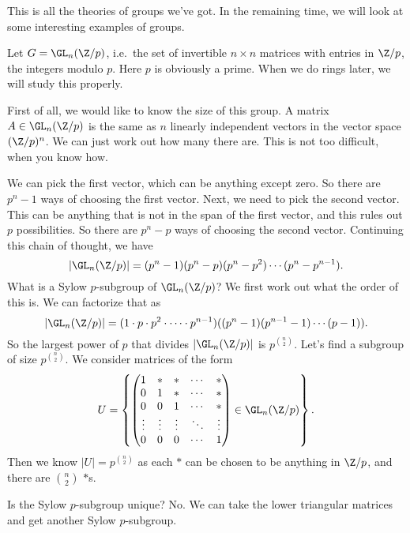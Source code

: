 \documentclass[a4paper]{article}
\begin{document}
This is all the theories of groups we've got. In the remaining time, we will look at some interesting examples of groups.
\begin{eg}
  Let $G = \GL_n(\Z/p)$, i.e.\ the set of invertible $n\times n$ matrices with entries in $\Z/p$, the integers modulo $p$. Here $p$ is obviously a prime. When we do rings later, we will study this properly.

  First of all, we would like to know the size of this group. A matrix $A \in \GL_n(\Z/p)$ is the same as $n$ linearly independent vectors in the vector space $(\Z/p)^n$. We can just work out how many there are. This is not too difficult, when you know how.

  We can pick the first vector, which can be anything except zero. So there are $p^n - 1$ ways of choosing the first vector. Next, we need to pick the second vector. This can be anything that is not in the span of the first vector, and this rules out $p$ possibilities. So there are $p^n - p$ ways of choosing the second vector. Continuing this chain of thought, we have
  \[
    |\GL_n(\Z/p)| = (p^n - 1)(p^n - p)(p^n - p^2) \cdots (p^n - p^{n - 1}).
  \]
  What is a Sylow $p$-subgroup of $\GL_n(\Z/p)$? We first work out what the order of this is. We can factorize that as
  \[
    |\GL_n(\Z/p)|= (1 \cdot p \cdot p^2 \cdot \cdots \cdot p^{n - 1}) ((p^n - 1)(p^{n - 1} - 1) \cdots (p - 1)).
  \]
  So the largest power of $p$ that divides $|\GL_n(\Z/p)|$ is $p^{\binom{n}{2}}$. Let's find a subgroup of size $p^{\binom{n}{2}}$. We consider matrices of the form
  \[
    U = \left\{
      \begin{pmatrix}
        1 & * & * & \cdots & *\\
        0 & 1 & * & \cdots & *\\
        0 & 0 & 1 & \cdots & *\\
        \vdots & \vdots & \vdots & \ddots & \vdots\\
        0 & 0 & 0 & \cdots & 1
      \end{pmatrix} \in \GL_n(\Z/p)
    \right\}.
  \]
  Then we know $|U| = p^{\binom{n}{2}}$ as each $*$ can be chosen to be anything in $\Z/p$, and there are $\binom{n}{2}$ $*$s.

  Is the Sylow $p$-subgroup unique? No. We can take the lower triangular matrices and get another Sylow $p$-subgroup.
\end{eg}
\end{document}
